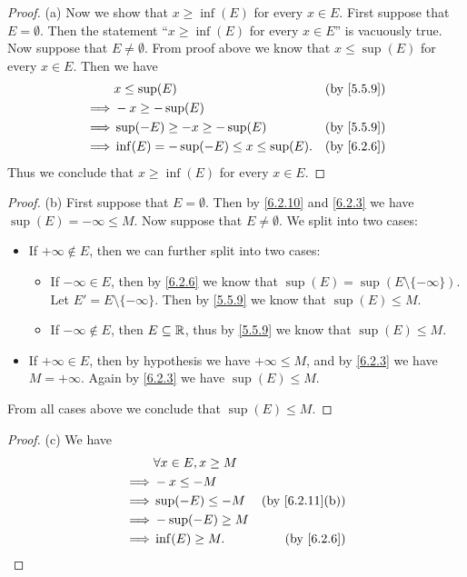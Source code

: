 \begin{proof}{(a)}
  Now we show that \(x \geq \inf(E)\) for every \(x \in E\).
  First suppose that \(E = \emptyset\).
  Then the statement ``\(x \geq \inf(E)\) for every \(x \in E\)'' is vacuously true.
  Now suppose that \(E \neq \emptyset\).
  From proof above we know that \(x \leq \sup(E)\) for every \(x \in E\).
  Then we have
  \begin{align*}
             & x \leq \sup(E)                           & \text{(by \cref{5.5.9})} \\
    \implies & -x \geq -\sup(E)                                                    \\
    \implies & \sup(-E) \geq -x \geq -\sup(E)           & \text{(by \cref{5.5.9})} \\
    \implies & \inf(E) = -\sup(-E) \leq x \leq \sup(E). & \text{(by \cref{6.2.6})}
  \end{align*}
  Thus we conclude that \(x \geq \inf(E)\) for every \(x \in E\).
\end{proof}

\begin{proof}{(b)}
  First suppose that \(E = \emptyset\).
  Then by \cref{6.2.10} and \cref{6.2.3} we have \(\sup(E) = -\infty \leq M\).
  Now suppose that \(E \neq \emptyset\).
  We split into two cases:
  \begin{itemize}
    \item If \(+\infty \not\in E\), then we can further split into two cases:
          \begin{itemize}
            \item If \(-\infty \in E\), then by \cref{6.2.6} we know that \(\sup(E) = \sup(E \setminus \{-\infty\})\).
                  Let \(E' = E \setminus \{-\infty\}\).
                  Then by \cref{5.5.9} we know that \(\sup(E) \leq M\).
            \item If \(-\infty \notin E\), then \(E \subseteq \mathbb{R}\), thus by \cref{5.5.9} we know that \(\sup(E) \leq M\).
          \end{itemize}
    \item If \(+\infty \in E\), then by hypothesis we have \(+\infty \leq M\), and by \cref{6.2.3} we have \(M = +\infty\).
          Again by \cref{6.2.3} we have \(\sup(E) \leq M\).
  \end{itemize}
  From all cases above we conclude that \(\sup(E) \leq M\).
\end{proof}

\begin{proof}{(c)}
  We have
  \begin{align*}
             & \forall x \in E, x \geq M                                \\
    \implies & -x \leq -M                                               \\
    \implies & \sup(-E) \leq -M          & \text{(by \cref{6.2.11}(b))} \\
    \implies & -\sup(-E) \geq M                                         \\
    \implies & \inf(E) \geq M.           & \text{(by \cref{6.2.6})}
  \end{align*}
\end{proof}

